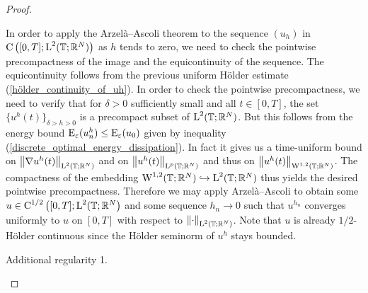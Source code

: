 \begin{proof}
\begin{description}[wide=0pt]
		In order to apply the Arzelà--Ascoli theorem to the sequence $ (u_{ h 
		} ) $ in $ \operatorname{C} \left( [ 0 , T ] ; \operatorname{L}^{ 2 } ( \operatorname{\mathbb{T}} ; \mathbb{ R 
		}^{ N } ) \right) $ as $ h $ tends to zero, we need to check the 
		pointwise precompactness of the image and the equicontinuity of the 
		sequence. 
		The equicontinuity follows from the previous uniform Hölder estimate 
		(\ref{hölder_continuity_of_uh}).
		In order to check the pointwise precompactness, we need to verify that 
		for $ \delta > 0 $ sufficiently small and all $ t \in [ 0 , T ] $, the 
		set
		$ \{ u^{ h } ( t ) \}_{ \delta > h > 0 } $ is a precompact subset of $ 
		\operatorname{L}^{ 2 } ( \operatorname{\mathbb{T}} ; \mathbb{ R }^{ N } ) $. 
		But this follows from the energy bound $ \operatorname{E}_{ \varepsilon } ( u_{ 
		n }^{ h } ) \leq \operatorname{E}_{ \varepsilon } ( u_{ 0 } ) $ given by 
		inequality (\ref{discrete_optimal_energy_dissipation}). In fact it 
		gives us a time-uniform bound on $ \norm{ \nabla u^{ h }( t ) }_{\operatorname{L}^{ 
		2 }( \operatorname{\mathbb{T}}; \mathbb{ R }^{ N } ) } $ and on $ \norm{ u^{ h } ( t 
		)}_{ \operatorname{L}^{ p } ( \operatorname{\mathbb{T}}; \mathbb{ R }^{ N } ) } $ and thus on $ 
		\norm{ u^{ h } ( t )}_{ \operatorname{W}^{ 1 , 2 } ( \operatorname{\mathbb{T}}; \mathbb{ R }^{ N } 
		) } $. 
		The compactness of the embedding
		$ \operatorname{W}^{ 1 , 2 } ( \operatorname{\mathbb{T}} ; \mathbb{ R }^{ N } ) \hookrightarrow \operatorname{L}^{ 2 } ( \operatorname{\mathbb{T}}; \mathbb{ R }^{ N } ) $ thus yields the desired pointwise precompactness.
		Therefore we may apply Arzelà--Ascoli to obtain some $ u \in \operatorname{C}^{ 1 
		/ 2 } \left( [ 0, T ] ; \operatorname{L}^{ 2 } ( \operatorname{\mathbb{T}} ; \mathbb{ R }^{ N } 
		\right) $ and some  sequence $ h_{ n } \to 0 $ such that
		$ u^{ h_{ n } } $ converges uniformly to $ u $ on $ [ 0 , T ] $ with 
		respect to $ \norm{ \cdot }_{ \operatorname{L}^{ 2 } ( \operatorname{\mathbb{T}} ; \mathbb{ R }^{ N 
		} ) } $.
		Note that $ u $ is already $ 1/2 $-Hölder continuous since the Hölder 
		seminorm of $ u^{ h } $ stays bounded.
		
		\item[Step 6:] Additional regularity 1.
		

\end{description}
\end{proof}

